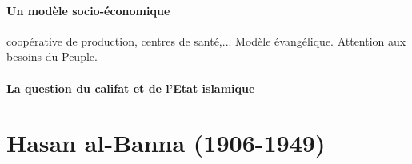\paragraph{Un modèle socio-économique} coopérative de production, centres de santé,... Modèle évangélique. Attention aux besoins du Peuple.
\paragraph{La question du califat et de l'Etat islamique}

    
\hypertarget{hasan-al-banna-1906-1949}{%
\section{\texorpdfstring{{Hasan al-Banna
(1906-1949)}}{Hasan al-Banna (1906-1949)}}\label{hasan-al-banna-1906-1949}}

\begin{Synthesis}[al-Banna]
 
\end{Synthesis}

